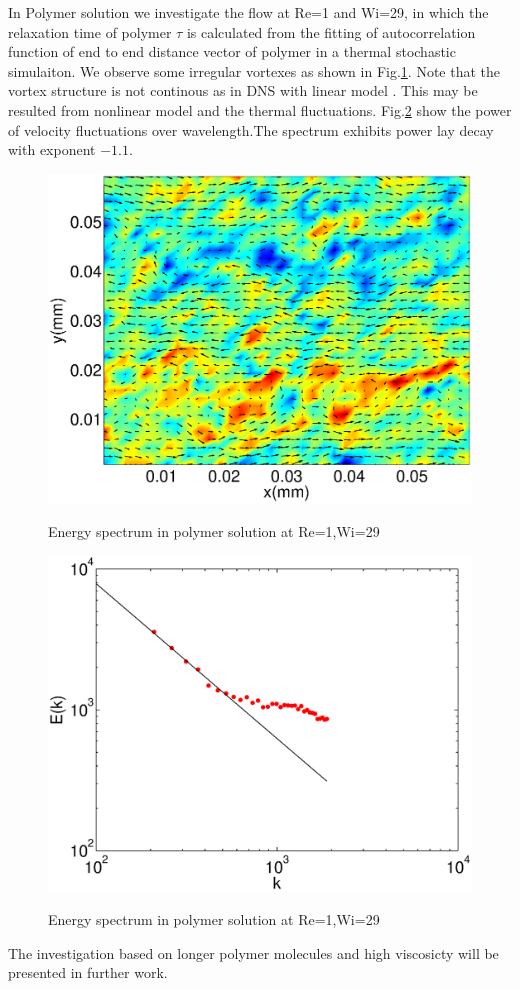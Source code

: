 \documentclass[aps,prl,twocolumn,showpacs,superscriptaddress,groupedaddress]{revtex4}  %
\begin{document}
In Polymer solution we investigate the flow at Re=1 and Wi=29, in which the relaxation time of polymer $\tau$ is 
calculated from the fitting of autocorrelation function of end to end distance vector of polymer in a thermal stochastic simulaiton.
We observe some irregular vortexes  as shown in Fig.\ref{fig:vorpols}. Note that the vortex structure is not continous as in DNS with linear model \cite{berti08}.
This may be resulted from nonlinear model and the thermal fluctuations.
Fig.\ref{fig:spepols} show the power of velocity fluctuations over wavelength.The spectrum exhibits power lay decay with exponent $-1.1$.
\begin{figure}
 \includegraphics[scale=0.35]{vorpols}
\label{fig:vorpols}
\caption{Energy spectrum in polymer solution at Re=1,Wi=29}
\end{figure}
\begin{figure}
 \includegraphics[scale=0.35]{spepols}
\label{fig:spepols}
\caption{Energy spectrum in polymer solution at Re=1,Wi=29}
\end{figure}
The investigation based on longer polymer molecules and high viscosicty will be presented in further work.\\


\end{document}

